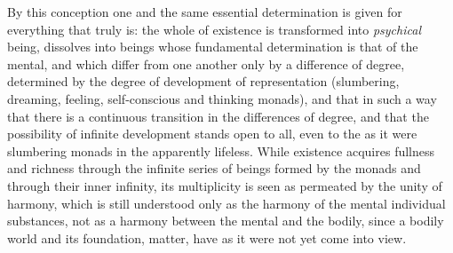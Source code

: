 By this conception one and the same essential determination is given
for everything that truly is: the whole of existence is transformed
into \emph{psychical} being, dissolves into beings whose fundamental
determination is that of the mental, and which differ from one another
only by a difference of degree, determined by the degree of development
of representation (slumbering, dreaming, feeling, self-conscious and
thinking monads), and that in such a way that there is a continuous
transition in the differences of degree, and that the possibility of
infinite development stands open to all, even to the as it were
slumbering monads in the apparently lifeless. While existence acquires
fullness and richness through the infinite series of beings formed by
the monads and through their inner infinity, its multiplicity is seen
as permeated by the unity of harmony, which is still understood only as
the harmony of the mental individual substances, not as a harmony
between the mental and the bodily, since a bodily world and its
foundation, matter, have as it were not yet come into view.

